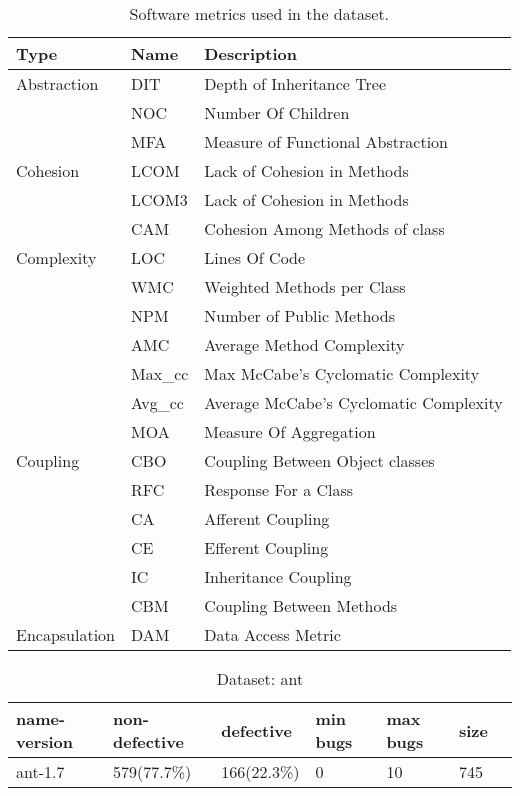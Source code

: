 \documentclass[]{article}
\begin{document}
	\begin{table}[h]
		\caption{Software metrics used in the dataset.}\label{tab:metrics}
		\begin{tabular}{lll}
			\hline
			Type & Name & Description  \\ \hline
			Abstraction & DIT & Depth of Inheritance Tree \\ 
			& NOC & Number Of Children  \\ 
			& MFA & Measure of Functional Abstraction  \\ \hline
			Cohesion & LCOM & Lack of Cohesion in Methods  \\ 
			& LCOM3 & Lack of Cohesion in Methods  \\
			& CAM & Cohesion Among Methods of class \\ \hline
			Complexity & LOC & Lines Of Code  \\ 
			& WMC & Weighted Methods per Class  \\
			& NPM & Number of Public Methods  \\ 
			& AMC & Average Method Complexity  \\ 
			& Max\_cc & Max McCabe's Cyclomatic Complexity  \\
			& Avg\_cc & Average McCabe's Cyclomatic Complexity   \\ 
			& MOA & Measure Of Aggregation  \\ \hline
			Coupling & CBO & Coupling Between Object classes  \\
			& RFC & Response For a Class  \\ 
			& CA & Afferent Coupling  \\
			& CE & Efferent Coupling  \\ 
			& IC & Inheritance Coupling  \\ 
			& CBM & Coupling Between Methods  \\ \hline
			Encapsulation & DAM & Data Access Metric  \\ \hline
		\end{tabular}
	\end{table}
	\FloatBarrier
	\begin{table}[h]
		\caption{Dataset: ant}\label{tab:ant}
		\begin{tabular}{lllllll}
			\hline
			name-version & non-defective & defective & min bugs & max bugs & size \\ \hline
			ant-1.7 & 579(77.7\%) & 166(22.3\%) & 0 & 10 & 745 \\ \hline
		\end{tabular}
	\end{table}
	
\end{document}
